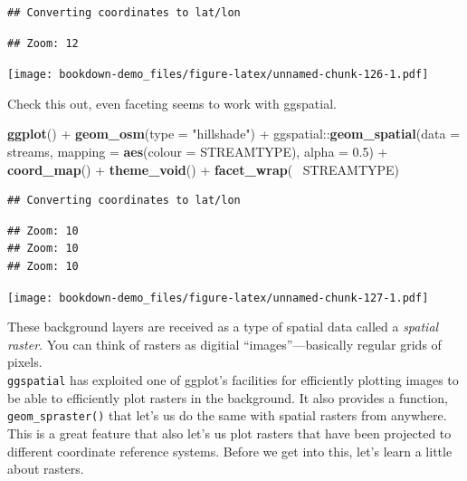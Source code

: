 \documentclass[]{book}
\newenvironment{Shaded}{\begin{snugshade}}{\end{snugshade}}
\newcommand{\KeywordTok}[1]{\textcolor[rgb]{0.13,0.29,0.53}{\textbf{{#1}}}}
\newcommand{\DataTypeTok}[1]{\textcolor[rgb]{0.13,0.29,0.53}{{#1}}}
\newcommand{\FloatTok}[1]{\textcolor[rgb]{0.00,0.00,0.81}{{#1}}}
\newcommand{\StringTok}[1]{\textcolor[rgb]{0.31,0.60,0.02}{{#1}}}
\newcommand{\NormalTok}[1]{{#1}}
\theoremstyle{definition}
\theoremstyle{definition}
\theoremstyle{remark}
\begin{document}
\begin{verbatim}
## Converting coordinates to lat/lon
\end{verbatim}

\begin{verbatim}
## Zoom: 12
\end{verbatim}

\texttt{[image: bookdown-demo\_files/figure-latex/unnamed-chunk-126-1.pdf]}

Check this out, even faceting seems to work with ggspatial.

\begin{Shaded}
\begin{Highlighting}[]
\KeywordTok{ggplot}\NormalTok{() +}
\StringTok{  }\KeywordTok{geom_osm}\NormalTok{(}\DataTypeTok{type =} \StringTok{"hillshade"}\NormalTok{) +}\StringTok{ }
\StringTok{  }\NormalTok{ggspatial::}\KeywordTok{geom_spatial}\NormalTok{(}\DataTypeTok{data =} \NormalTok{streams, }\DataTypeTok{mapping =} \KeywordTok{aes}\NormalTok{(}\DataTypeTok{colour =} \NormalTok{STREAMTYPE), }\DataTypeTok{alpha =} \FloatTok{0.5}\NormalTok{) +}
\StringTok{  }\KeywordTok{coord_map}\NormalTok{() +}
\StringTok{  }\KeywordTok{theme_void}\NormalTok{() +}
\StringTok{  }\KeywordTok{facet_wrap}\NormalTok{(~}\StringTok{ }\NormalTok{STREAMTYPE)}
\end{Highlighting}
\end{Shaded}

\begin{verbatim}
## Converting coordinates to lat/lon
\end{verbatim}

\begin{verbatim}
## Zoom: 10
## Zoom: 10
## Zoom: 10
\end{verbatim}

\texttt{[image: bookdown-demo\_files/figure-latex/unnamed-chunk-127-1.pdf]}

These background layers are received as a type of spatial data called a
\emph{spatial raster}. You can think of rasters as digitial
``images''---basically regular grids of pixels.\\
\texttt{ggspatial} has exploited one of ggplot's facilities for
efficiently plotting images to be able to efficiently plot rasters in
the background. It also provides a function, \texttt{geom\_spraster()}
that let's us do the same with spatial rasters from anywhere. This is a
great feature that also let's us plot rasters that have been projected
to different coordinate reference systems. Before we get into this,
let's learn a little about rasters.
\end{document}
